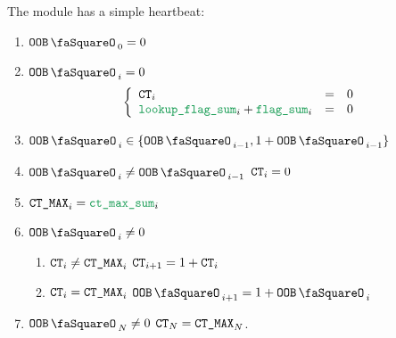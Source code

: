 The \oobMod{} module has a simple heartbeat:
\begin{enumerate}
	\item $\oobStamp_{0} = 0$
	\item \If $\oobStamp_{i} = 0$ \Then
		\[
			\left\{ \begin{array}{lcl}
				\ct_{i}                          & = & 0 \\
				\locLookupFlagSum_{i} + \flagSum_{i} & = & 0 \\
			\end{array} \right.
		\] 
	\item $\oobStamp_{i} \in \{ \oobStamp_{i - 1}, 1 + \oobStamp_{i - 1} \}$
	\item \If $\oobStamp_{i} \neq \oobStamp_{i - 1}$ \Then $\texttt{CT}_{i} = 0$
	\item $\maxCt_{i} = \maxCtFlagSum_{i}$
	\item \If $\oobStamp_{i} \neq 0$ \Then
		\begin{enumerate}
			\item \If $\texttt{CT}_{i} \neq \texttt{CT\_MAX}_{i}$ \Then $\texttt{CT}_{i + 1} = 1 + \texttt{CT}_{i}$
			\item \If $\texttt{CT}_{i} =    \texttt{CT\_MAX}_{i}$ \Then $\oobStamp_{i + 1} = 1 + \oobStamp_{i}$
		\end{enumerate}
	\item \If $\oobStamp_{N} \neq 0$ \Then $\texttt{CT}_{N} = \texttt{CT\_MAX}_{N}$.
\end{enumerate}
